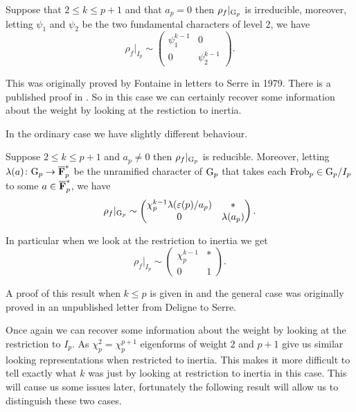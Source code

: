 \documentclass[a4paper,12pt]{article}
\begin{document}
\begin{thm}[Fontaine]\label{thm:super}
Suppose that $2\le k \le p +1$ and that $a_p = 0$ then $\rho_{f}|_{\mathrm{G}_p}$ is irreducible, moreover, letting $\psi_1$ and $\psi_2$ be the two fundamental characters of level 2, we have
\[
\rho_{f}|_{I_p} \sim \begin{pmatrix} \psi_1^{k-1} & 0 \\ 0 & \psi_2^{k-1}\end{pmatrix}.
\]
\end{thm}

This was originally proved by Fontaine in letters to Serre in 1979.
There is a published proof in \cite[sec. 6]{EdixhovenWeight}.
So in this case we can certainly recover some information about the weight by looking at the restiction to inertia.

In the ordinary case we have slightly different behaviour.

\begin{thm}[Deligne]\label{thm:ordinary}
Suppose $2\le k\le p+1$ and $a_p \ne 0$ then $\rho_{f}|_{\mathrm{G}_p}$ is reducible.
Moreover, letting $\lambda(a)\colon \mathrm{G}_p \to \overline{\mathbf{F}}_p^*$ be the unramified character of $\mathrm{G}_p$ that takes each $\operatorname{Frob}_p \in \mathrm{G}_p /I_p$ to some $a\in\overline{\mathbf{F}}_p^*$, we have
\[
\rho_{f}|_{\mathrm{G}_p} \sim \begin{pmatrix} \chi_p^{k-1}\lambda(\varepsilon(p)/a_p) & * \\ 0 & \lambda(a_p)\end{pmatrix}.
\]

In particular when we look at the restriction to inertia we get
\[
\rho_{f}|_{I_{p}} \sim \begin{pmatrix} \chi_p^{k-1} & * \\ 0 & 1\end{pmatrix}.
\]
\end{thm}

A proof of this result when $k \le p$ is given in \cite{Gross} and the general case was originally proved in an unpublished letter from Deligne to Serre.

Once again we can recover some information about the weight by looking at the restriction to $I_p$.
As $\chi_p^{2} = \chi_p^{p+1}$ eigenforms of weight $2$ and $p+1$ give us similar looking representations when restricted to inertia.
This makes it more difficult to tell exactly what $k$ was just by looking at restriction to inertia in this case.
This will cause us some issues later, fortunately the following result will allow us to distinguish these two cases.
\end{document}
